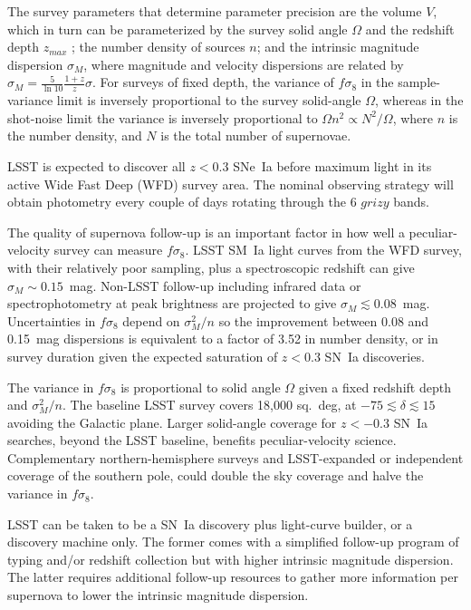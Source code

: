 \documentclass{aastex62}   	%
\begin{document}
The survey parameters that determine parameter precision are the volume $V$, which
in turn can be parameterized by the survey solid angle $\Omega$ and the redshift depth $z_{max}$ ; the number density of sources $n$; and the intrinsic
magnitude dispersion $\sigma_M$, where magnitude and velocity dispersions are related by $\sigma_{M} = \frac{5}{\ln{10}} \frac{1+z}{z} \sigma$.
For surveys of fixed depth, the variance of $f\sigma_8$ 
in the sample-variance limit  
is inversely proportional to the survey solid-angle $\Omega$, whereas
in the shot-noise limit the variance is inversely proportional to $\Omega n^2 \propto N^2/\Omega$, where $n$ is the number density,
and $N$ is the total number of supernovae.  

LSST is expected to discover all $z<0.3$ SNe~Ia before maximum light in its active Wide Fast Deep (WFD) survey area.
The nominal observing strategy will obtain photometry every couple of days rotating through the 6 $grizy$ bands.

The quality of supernova follow-up is an important factor in how well a peculiar-velocity survey can measure $f\sigma_8$.
LSST SM~Ia light curves from the WFD survey, with their relatively poor sampling, plus a spectroscopic redshift
 can give $\sigma_M \sim 0.15$~mag. Non-LSST follow-up including infrared data \citep{2012MNRAS.425.1007B} or spectrophotometry at peak brightness
 \citep{2015ApJ...815...58F} are projected to give
$\sigma_M \lesssim 0.08$~mag.
Uncertainties in $f\sigma_8$ depend on $\sigma^2_M/n$ so the improvement between 0.08 and 0.15~mag dispersions is equivalent to a factor of 3.52
 in number density, or in survey duration given the expected saturation of $z<0.3$ SN~Ia discoveries.

The variance in $f\sigma_8$ is proportional to solid angle $\Omega$ given a fixed redshift depth and  $\sigma^2_M/n$.  The baseline
LSST survey covers 18,000 sq.~deg, at $-75 \lesssim \delta \lesssim15$ avoiding the Galactic plane.  Larger solid-angle coverage for $z<-0.3$ SN~Ia searches, beyond
the LSST baseline, benefits peculiar-velocity science.  Complementary northern-hemisphere surveys and LSST-expanded or independent
coverage of the southern pole, could double
the sky coverage and halve the variance in $f\sigma_8$.

LSST can be taken to be a SN~Ia discovery plus light-curve builder, or a discovery machine only.  The former comes with a simplified follow-up program of typing
and/or redshift collection but with higher intrinsic magnitude dispersion.  The latter requires additional follow-up resources to gather more information per supernova to
lower the intrinsic magnitude dispersion.
\end{document}
